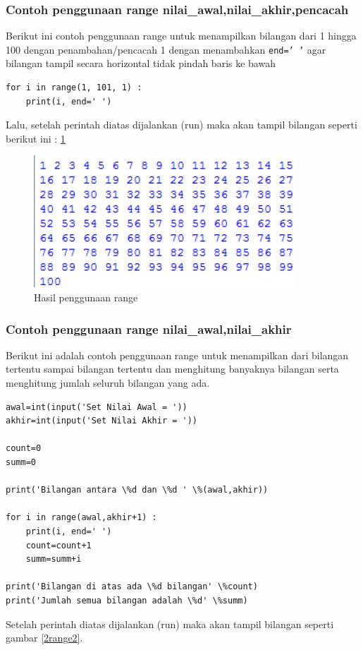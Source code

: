 \subsubsection{Contoh penggunaan range nilai\_awal,nilai\_akhir,pencacah}
Berikut ini contoh penggunaan range untuk menampilkan bilangan dari 1 hingga 100 dengan penambahan/pencacah 1 dengan menambahkan \verb|end=’ ’| agar bilangan tampil secara horizontal tidak pindah baris ke bawah
\begin{verbatim}
for i in range(1, 101, 1) :
    print(i, end=' ')
\end{verbatim}
Lalu, setelah perintah diatas dijalankan (run) maka akan tampil bilangan seperti berikut ini :
\ref{2range}

\begin{figure}[ht]
    \centerline{\includegraphics[width=.5\textwidth]{figures/2range.JPG}}
    \caption{Hasil penggunaan range}
    \label{2range}
    \end{figure}
    
\subsubsection{Contoh penggunaan range nilai\_awal,nilai\_akhir}
Berikut ini adalah contoh penggunaan range untuk menampilkan dari bilangan tertentu sampai bilangan tertentu dan menghitung banyaknya bilangan serta menghitung jumlah seluruh bilangan yang ada.
\begin{verbatim}
awal=int(input('Set Nilai Awal = '))
akhir=int(input('Set Nilai Akhir = '))

count=0
summ=0

print('Bilangan antara \%d dan \%d ' \%(awal,akhir))

for i in range(awal,akhir+1) :
	print(i, end=' ')
	count=count+1
	summ=summ+i

print('Bilangan di atas ada \%d bilangan' \%count)
print('Jumlah semua bilangan adalah \%d' \%summ)
\end{verbatim}

Setelah perintah diatas dijalankan (run) maka akan tampil bilangan seperti gambar \ref{2range2}.

